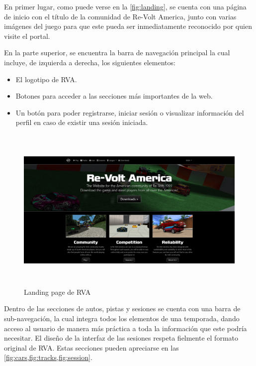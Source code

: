 En primer lugar, como puede verse en la \autoref{fig:landing}, se cuenta con una página de inicio con el título de la comunidad de Re-Volt America, junto con varias imágenes del juego para que este pueda ser inmediatamente reconocido por quien visite el portal.

En la parte superior, se encuentra la barra de navegación principal la cual incluye, de izquierda a derecha, los siguientes elementos:
\begin{itemize}
  \item El logotipo de RVA.
  \item Botones para acceder a las secciones más importantes de la web.
  \item Un botón para poder registrarse, iniciar sesión o visualizar información del perfil en caso de existir una sesión iniciada.
\end{itemize}

\begin{figure}[H]
  \begin{center}
    \includegraphics[width=15cm, height=8cm]{img/landing.png} 
  \end{center}
  \caption[Landing page de RVA]{Landing page de RVA}
  \label{fig:landing}
\end{figure}

Dentro de las secciones de autos, pistas y sesiones se cuenta con una barra de sub-navegación, la cual integra todos los elementos de una temporada, dando acceso al usuario de manera más práctica a toda la información que este podría necesitar. El diseño de la interfaz de las sesiones respeta fielmente el formato original de RVA. Estas secciones pueden apreciarse en las \cref{fig:cars,fig:tracks,fig:session}.

